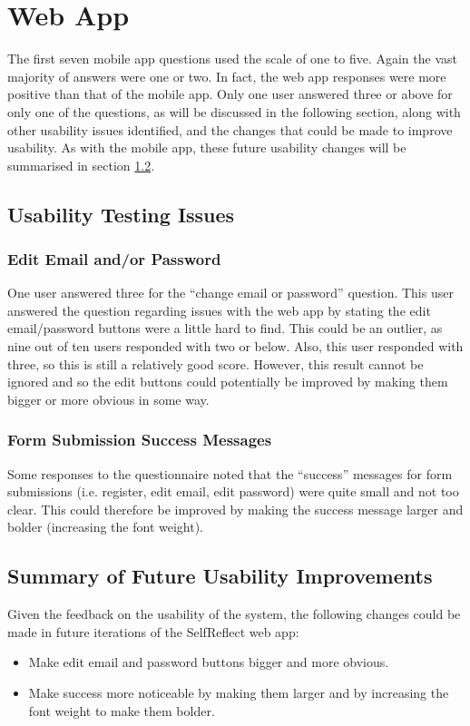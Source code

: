 \documentclass[11pt,openright,a4paper]{report}
\begin{document}
\section{Web App}
The first seven mobile app questions used the scale of one to five. Again the vast majority of answers were one or two. In fact, the web app responses were more positive than that of the mobile app. Only one user answered three or above for only one of the questions, as will be discussed in the following section, along with other usability issues identified, and the changes that could be made to improve usability. As with the mobile app, these future usability changes will be summarised in section \ref{subsec:webusabilityimp}.

\subsection{Usability Testing Issues}
\subsubsection{Edit Email and/or Password}
One user answered three for the \enquote{change email or password} question. This user answered the question regarding issues with the web app by stating the edit email/password buttons were a little hard to find. This could be an outlier, as nine out of ten users responded with two or below. Also, this user responded with three, so this is still a relatively good score. However, this result cannot be ignored and so the edit buttons could potentially be improved by making them bigger or more obvious in some way.

\subsubsection{Form Submission Success Messages}
Some responses to the questionnaire noted that the \enquote{success} messages for form submissions (i.e. register, edit email, edit password) were quite small and not too clear. This could therefore be improved by making the success message larger and bolder (increasing the font weight).

\subsection{Summary of Future Usability Improvements} \label{subsec:webusabilityimp}
Given the feedback on the usability of the system, the following changes could be made in future iterations of the SelfReflect web app:
\begin{itemize}
\item Make edit email and password buttons bigger and more obvious.
\item Make success more noticeable by making them larger and by increasing the font weight to make them bolder.
\end{itemize}
\end{document}
